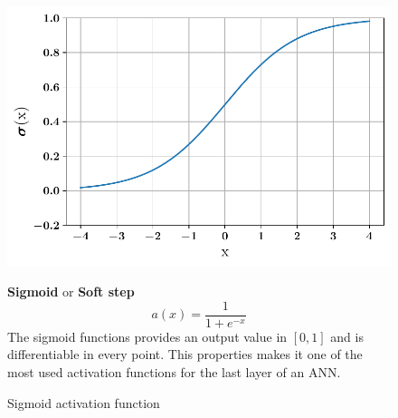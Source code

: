 \begin{figure}[!h]
\begin{minipage}{0.45\textwidth}

    \centering
\includegraphics[width=\textwidth]{images/networks/act_sig.pdf}
\caption{Sigmoid activation function}
    \label{fig:act_sig}
\end{minipage}
\hfill
\begin{minipage}{0.5\textwidth}
    \textbf{Sigmoid} or \textbf{Soft step}
   \begin{equation}
       a(x) =\frac{1}{1+e^{-x}}
   \end{equation}
   The sigmoid functions provides an output value in $[0,1]$ and is differentiable in every point. This properties makes it one of the most used activation functions for the last layer of an ANN.
\end{minipage}
    \end{figure}


